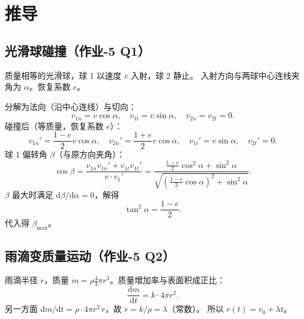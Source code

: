 \documentclass[UTF8,a4paper,11pt]{ctexart}
\begin{document}
\section{推导}
\label{sec:derive}

\subsection{光滑球碰撞（作业-5 Q1）}
\label{sub:collision}

质量相等的光滑球，球 1 以速度 $v$ 入射，球 2 静止。
入射方向与两球中心连线夹角为 $\alpha$。恢复系数 $e$。

分解为法向（沿中心连线）与切向：
\begin{equation}
  v_{1n}=v\cos\alpha,\quad v_{1t}=v\sin\alpha,\quad v_{2n}=v_{2t}=0.
\end{equation}
碰撞后（等质量，恢复系数 $e$）：
\begin{equation}
  v_{1n}'=\frac{1-e}{2}v\cos\alpha,\quad
  v_{2n}'=\frac{1+e}{2}v\cos\alpha,\quad
  v_{1t}'=v\sin\alpha,\quad v_{2t}'=0.
\end{equation}
球 1 偏转角 $\beta$（与原方向夹角）：
\begin{equation}
  \cos\beta=\frac{v_{1n}v_{1n}'+v_{1t}v_{1t}'}{v\cdot v_1'}
  =\frac{\frac{1-e}{2}\cos^2\alpha+\sin^2\alpha}
         {\sqrt{\left(\frac{1-e}{2}\cos\alpha\right)^2+\sin^2\alpha}}.
\end{equation}
$\beta$ 最大时满足 $\mathrm d\beta/\mathrm d\alpha=0$，解得
\begin{equation}
  \tan^2\alpha=\frac{1-e}{2}.
  \label{eq:alpha-max}
\end{equation}
代入得 $\beta_{\max}$。

\subsection{雨滴变质量运动（作业-5 Q2）}
\label{sub:raindrop}

雨滴半径 $r$，质量 $m=\rho\frac43\pi r^3$。质量增加率与表面积成正比：
\begin{equation}
  \frac{\mathrm dm}{\mathrm dt}=k\cdot 4\pi r^2.
\end{equation}
另一方面 $\mathrm dm/\mathrm dt=\rho\cdot 4\pi r^2\,\dot r$，故 $\dot r=k/\rho=\lambda$（常数）。
所以 $r(t)=r_0+\lambda t$。
\end{document}
